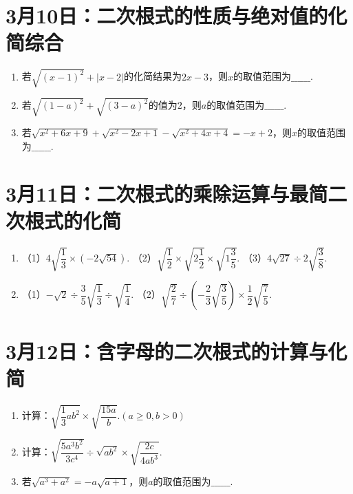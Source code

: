 \section*{3月10日：二次根式的性质与绝对值的化简综合}

\begin{enumerate}
    \item 若$\sqrt{(x-1)^2}+|x-2|$的化简结果为$2x-3$，则$x$的取值范围为$\_\_\_\_\_\_$.
    \item 若$\sqrt{(1-a)^2}+\sqrt{(3-a)^2}$的值为$2$，则$a$的取值范围为$\_\_\_\_\_\_$.
    \item 若$\sqrt{x^2+6x+9}+\sqrt{x^2-2x+1}-\sqrt{x^2+4x+4}=-x+2$，则$x$的取值范围为$\_\_\_\_\_\_$.
\end{enumerate}

\newpage

\section*{3月11日：二次根式的乘除运算与最简二次根式的化简}

\begin{enumerate}


\item （1）$4\sqrt{\dfrac{1}{3}}\times(-2\sqrt{54}).$
（2）$\sqrt{\dfrac{1}{2}}\times\sqrt{2 \dfrac{1}{2}}\times\sqrt{1 \dfrac{3}{5}}.$
（3）$4\sqrt{27}\div 2\sqrt{\dfrac{3}{8}}.$

\item（1）$-\sqrt{2}\div\dfrac{3}{5}\sqrt{\dfrac{1}{3}}\div\sqrt{\dfrac{1}{4}}.$
（2）$\sqrt{\dfrac{2}{7}}\div\left(-\dfrac{2}{3}\sqrt{\dfrac{3}{5}}\right)\times\dfrac{1}{2}\sqrt{\dfrac{7}{5}}.$

\end{enumerate}





\section*{3月12日：含字母的二次根式的计算与化简}

\begin{enumerate}
    \item 计算：$\sqrt{\dfrac{1}{3}ab^2}\times\sqrt{\dfrac{15a}{b}}. (a\geq 0, b>0)$
    \item 计算：$\sqrt{\dfrac{5a^3b^2}{3c^4}}\div\sqrt{ab^2}\times\sqrt{\dfrac{2c}{4ab^3}}.$
    \item 若$\sqrt{a^3+a^2}=-a\sqrt{a+1}$，则$a$的取值范围为$\_\_\_\_\_\_$.
\end{enumerate}

